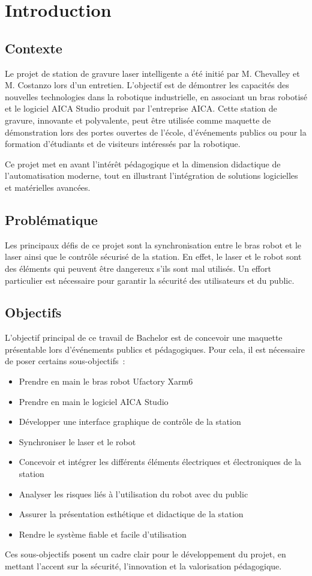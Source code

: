 \chapter{Introduction}
\label{chap:intro}


\section{Contexte}

Le projet de station de gravure laser intelligente a été initié par M. Chevalley et M. Costanzo lors d'un entretien. L'objectif est de démontrer les capacités des nouvelles technologies dans la robotique industrielle, en associant un bras robotisé et le logiciel AICA Studio produit par l'entreprise AICA. Cette station de gravure, innovante et polyvalente, peut être utilisée comme maquette de démonstration lors des portes ouvertes de l'école, d'événements publics ou pour la formation d'étudiants et de visiteurs intéressés par la robotique.

Ce projet met en avant l'intérêt pédagogique et la dimension didactique de l'automatisation moderne, tout en illustrant l'intégration de solutions logicielles et matérielles avancées.

\section{Problématique}

Les principaux défis de ce projet sont la synchronisation entre le bras robot et le laser ainsi que le contrôle sécurisé de la station. En effet, le laser et le robot sont des éléments qui peuvent être dangereux s'ils sont mal utilisés. Un effort particulier est nécessaire pour garantir la sécurité des utilisateurs et du public.


\section{Objectifs}

L'objectif principal de ce travail de Bachelor est de concevoir une maquette présentable lors d'événements publics et pédagogiques. Pour cela, il est nécessaire de poser certains sous-objectifs :

\begin{itemize}
    \item Prendre en main le bras robot Ufactory Xarm6
    \item Prendre en main le logiciel AICA Studio
    \item Développer une interface graphique de contrôle de la station
    \item Synchroniser le laser et le robot
    \item Concevoir et intégrer les différents éléments électriques et électroniques de la station
    \item Analyser les risques liés à l'utilisation du robot avec du public
    \item Assurer la présentation esthétique et didactique de la station
    \item Rendre le système fiable et facile d'utilisation
\end{itemize}

Ces sous-objectifs posent un cadre clair pour le développement du projet, en mettant l'accent sur la sécurité, l'innovation et la valorisation pédagogique.


